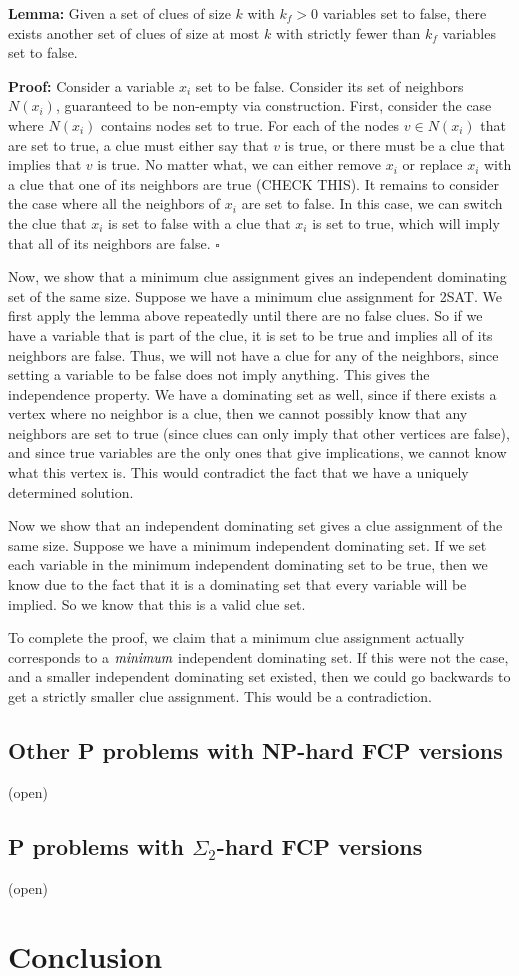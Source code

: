 \documentclass[runningheads,a4paper]{llncs}
\begin{document}
\textbf{Lemma:} Given a set of clues of size $k$ with $k_f > 0$ variables set to false, there exists another set of clues of size at most $k$ with strictly fewer than $k_f$ variables set to false.

\textbf{Proof:} Consider a variable $x_i$ set to be false. Consider its set of neighbors $N(x_i)$, guaranteed to be non-empty via construction. First, consider the case where $N(x_i)$ contains nodes set to true. For each of the nodes $v \in N(x_i)$ that are set to true, a clue must either say that $v$ is true, or there must be a clue that implies that $v$ is true. No matter what, we can either remove $x_i$ or replace $x_i$ with a clue that one of its neighbors are true (CHECK THIS). It remains to consider the case where all the neighbors of $x_i$ are set to false. In this case, we can switch the clue that $x_i$ is set to false with a clue that $x_i$ is set to true, which will imply that all of its neighbors are false. $\square$

Now, we show that a minimum clue assignment gives an independent dominating set of the same size. Suppose we have a minimum clue assignment for 2SAT. We first apply the lemma above repeatedly until there are no false clues. So if we have a variable that is part of the clue, it is set to be true and implies all of its neighbors are false. Thus, we will not have a clue for any of the neighbors, since setting a variable to be false does not imply anything. This gives the independence property. We have a dominating set as well, since if there exists a vertex where no neighbor is a clue, then we cannot possibly know that any neighbors are set to true (since clues can only imply that other vertices are false), and since true variables are the only ones that give implications, we cannot know what this vertex is. This would contradict the fact that we have a uniquely determined solution.

Now we show that an independent dominating set gives a clue assignment of the same size. Suppose we have a minimum independent dominating set. If we set each variable in the minimum independent dominating set to be true, then we know due to the fact that it is a dominating set that every variable will be implied. So we know that this is a valid clue set.

To complete the proof, we claim that a minimum clue assignment actually corresponds to a $\emph{minimum}$ independent dominating set. If this were not the case, and a smaller independent dominating set existed, then we could go backwards to get a strictly smaller clue assignment. This would be a contradiction. 

\subsection{Other P problems with NP-hard FCP versions}

(open)

\subsection{P problems with $\Sigma_2$-hard FCP versions}

(open)

\section{Conclusion}
\label{sec:conclusion}




\end{document}
